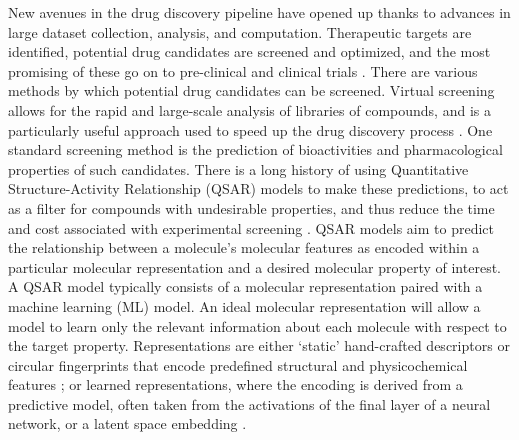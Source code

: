 %

New avenues in the drug discovery pipeline have opened up thanks to advances in large dataset collection, analysis, and computation. Therapeutic targets are identified, potential drug candidates are screened and optimized, and the most promising of these go on to pre-clinical and clinical trials \citep{Lill2007}. There are various methods by which potential drug candidates can be screened. Virtual screening allows for the rapid and large-scale analysis of libraries of compounds, and is a particularly useful approach used to speed up the drug discovery process \citep{Neves2018}. One standard screening method is the prediction of bioactivities and pharmacological properties of such candidates. There is a long history of using Quantitative Structure-Activity Relationship (QSAR) models to make these predictions, to act as a filter for compounds with undesirable properties, and thus reduce the time and cost associated with experimental screening \citep{Sabando2021}. QSAR models aim to predict the relationship between a molecule's molecular features as encoded within a particular molecular representation and a desired molecular property \citep{Sabando2021} of interest. A QSAR model typically consists of a molecular representation paired with a machine learning (ML) model. An ideal molecular representation will allow a model to learn only the relevant information about each molecule with respect to the target property. Representations are either `static' hand-crafted descriptors or circular fingerprints that encode predefined structural and physicochemical features \citep{rogers2010, David2020, sns, avalon}; or learned representations, where the encoding is derived from a predictive model, often taken from the activations of the final layer of a neural network, or a latent space embedding \citep{Sabando2021, kishimoto2023}. 

